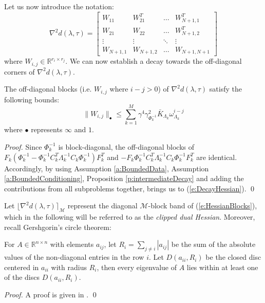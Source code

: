 Let us now introduce the notation:
\begin{equation} \label{e:HessianBlocks}
\nabla^2 d(\lambda, \tau) = \left[ \begin{array}{cccc}
W_{11} & W_{21}^T & \hdots & W_{N+1,1}^T \\
W_{21} & W_{22} & \hdots & W_{N+1,2}^T \\
\vdots & \vdots  & \ddots & \vdots \\
W_{N+1,1} & W_{N+1,2} & \hdots & W_{N+1,N+1}
\end{array} \right]
\end{equation}
where $W_{i,j} \in \mathbb{R}^{r_i \times r_j}$. We can now establish a decay towards the off-diagonal corners of $\nabla^2 d(\lambda, \tau)$.

\begin{proposition} \label{p:DecayHessian}
The off-diagonal blocks (i.e. $W_{i,j}$ where $i - j > 0$) of $\nabla^2 d(\lambda, \tau)$ satisfy the following bounds:
\begin{equation}
\label{e:DecayHessian}
\| W_{i,j} \|_\bullet \leq \sum_{k=1}^M \gamma^4 \gamma_{\Phi_k^{-1}}^2 \bar{K}_{\Lambda_k} \omega_{\Lambda_k}^{i-j} 
\end{equation}
where $\bullet$ represents $\infty$ and $1$.
\end{proposition}
\begin{proof}
Since $\Phi_k^{-1}$ is block-diagonal, the off-diagonal blocks of $F_k (\Phi_k^{-1} - \Phi_k^{-1} C_k^T \Lambda_k^{-1} C_k \Phi_k^{-1}) F_k^T$ and $-F_k \Phi_k^{-1} C_k^T \Lambda_k^{-1} C_k \Phi_k^{-1} F_k^T$ are identical. Accordingly, by using Assumption \ref{a:BoundedData}, Assumption \ref{a:BoundedConditioning}, Proposition \ref{p:intermediateDecay} and adding the contributions from all subproblems together, brings us to (\ref{e:DecayHessian}).
\qed
\end{proof}

Let $\lfloor \nabla^2 d(\lambda, \tau) \rceil_{\mathcal{M}}$ represent the diagonal $\mathcal{M}$-block band of (\ref{e:HessianBlocks}), which in the following will be referred to as the \emph{clipped dual Hessian}. Moreover, recall Gershgorin's circle theorem:
\begin{theorem} \label{l:Gerschgorin}
For $A \in \mathbb{R}^{n \times n}$ with elements $a_{ij}$, let $R_i = \sum_{j \neq i} | a_{ij} |$ be the sum of the absolute values of the non-diagonal entries in the row $i$. Let $D(a_{ii},R_i)$ be the closed disc centered in $a_{ii}$ with radius $R_i$, then every eigenvalue of $A$ lies within at least one of the discs $D(a_{ii}, R_i)$.
\end{theorem}
\begin{proof}
A proof is given in \cite{HornR2013}.
\qed
\end{proof}

